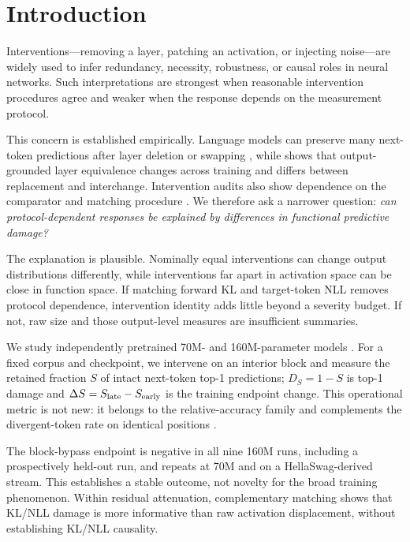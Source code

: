 \section{Introduction}

Interventions---removing a layer, patching an activation, or injecting
noise---are widely used to infer redundancy, necessity, robustness, or causal
roles in neural networks. Such interpretations are strongest when reasonable
intervention procedures agree and weaker when the response depends on the
measurement protocol.

This concern is established empirically. Language models can preserve many
next-token predictions after layer deletion or swapping
\citep{lad2025remarkable}, while \citet{garcia2026nofreeswap} shows that
output-grounded layer equivalence changes across training and differs between
replacement and interchange. Intervention audits also show dependence on the
comparator and matching procedure \citep{luo2026steercheck}. We therefore ask
a narrower question: \emph{can protocol-dependent responses be explained by
differences in functional predictive damage?}

The explanation is plausible. Nominally equal interventions can change output
distributions differently, while interventions far apart in activation space
can be close in function space. If matching forward KL and target-token NLL
removes protocol dependence, intervention identity adds little beyond a
severity budget. If not, raw size and those output-level measures are
insufficient summaries.

We study independently pretrained 70M- and 160M-parameter \model{} models
\citep{biderman2023pythia}. For a fixed corpus and checkpoint, we intervene on
an interior block and measure the retained fraction $S$ of intact next-token
top-1 predictions; $D_S=1-S$ is top-1 damage and
$\Delta S=S_{\mathrm{late}}-S_{\mathrm{early}}$ is the training endpoint change.
This operational metric is not new: it belongs to the relative-accuracy family
\citep{lad2025remarkable} and complements the divergent-token rate on identical
positions \citep{deiseroth2024dtm}.

The block-bypass endpoint is negative in all nine 160M runs, including a
prospectively held-out run, and repeats at 70M and on a HellaSwag-derived
stream. This establishes a stable outcome, not novelty for the broad training
phenomenon. Within residual attenuation, complementary matching shows that
KL/NLL damage is more informative than raw activation displacement, without
establishing KL/NLL causality.

